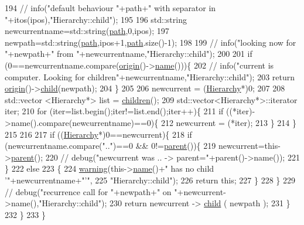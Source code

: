 \begin{DoxyCode}
194       \textcolor{comment}{//      info("default behaviour "+path+" with separator in "+itos(ipos),"Hierarchy::child");}
195 
196       std::string newcurrentname=std::string(\hyperlink{classHierarchy_aa7990fa7caf132d83e361ce033c6c65a}{path},0,ipos);
197       newpath=std::string(\hyperlink{classHierarchy_aa7990fa7caf132d83e361ce033c6c65a}{path},ipos+1,\hyperlink{classHierarchy_aa7990fa7caf132d83e361ce033c6c65a}{path}.size()-1);
198 
199       \textcolor{comment}{//      info("looking now for "+newpath+" from "+newcurrentname,"Hierarchy::child");}
200 
201       \textcolor{keywordflow}{if} (0==newcurrentname.compare(\hyperlink{classHierarchy_aee461dc930ce3871636ff87f075b1b83}{origin}()->\hyperlink{classObject_a300f4c05dd468c7bb8b3c968868443c1}{name}()))\{
202         \textcolor{comment}{//        info("current is computer. Looking for children"+newcurrentname,"Hierarchy::child");}
203         \textcolor{keywordflow}{return} \hyperlink{classHierarchy_aee461dc930ce3871636ff87f075b1b83}{origin}()->\hyperlink{classHierarchy_a1e207f973c694b538bf90107b4868817}{child}(newpath);
204       \}
205 
206       newcurrent = (\hyperlink{classHierarchy}{Hierarchy}*)0;
207 
208       std::vector <Hierarchy*> list = \hyperlink{classHierarchy_aa9a76f69e98e052ee1a6e32cea006288}{children}();
209       std::vector<Hierarchy*>::iterator iter;
210       \textcolor{keywordflow}{for} (iter=list.begin();iter!=list.end();iter++)\{
211         \textcolor{keywordflow}{if} ((*iter)->name().compare(newcurrentname)==0)\{
212           newcurrent = (*iter);
213         \}
214       \}
215 
216 
217       \textcolor{keywordflow}{if} ((\hyperlink{classHierarchy}{Hierarchy}*)0==newcurrent)\{
218         \textcolor{keywordflow}{if} (newcurrentname.compare(\textcolor{stringliteral}{".."})==0 && 0!=\hyperlink{classHierarchy_a1c7bec8257e717f9c1465e06ebf845fc}{parent}())\{
219           newcurrent=this->\hyperlink{classHierarchy_a1c7bec8257e717f9c1465e06ebf845fc}{parent}();
220           \textcolor{comment}{//          debug("newcurrent was .. -> parent="+parent()->name());}
221         \}
222         \textcolor{keywordflow}{else}
223         \{
224           \hyperlink{classObject_a65cd4fda577711660821fd2cd5a3b4c9}{warning}(this->\hyperlink{classObject_a300f4c05dd468c7bb8b3c968868443c1}{name}()+\textcolor{stringliteral}{" has no child '"}+newcurrentname+\textcolor{stringliteral}{"'"},
225               \textcolor{stringliteral}{"Hierarchy::child"});
226           \textcolor{keywordflow}{return} \textcolor{keyword}{this};
227         \}
228       \}
229       \textcolor{comment}{//      debug("recurrence call for "+newpath+" on "+newcurrent->name(),"Hierarchy::child");}
230       \textcolor{keywordflow}{return} newcurrent -> \hyperlink{classHierarchy_a1e207f973c694b538bf90107b4868817}{child} ( newpath );
231     \}
232   \}
233 \}
\end{DoxyCode}
\mbox{\label{classHierarchy_aa9a76f69e98e052ee1a6e32cea006288}} 
